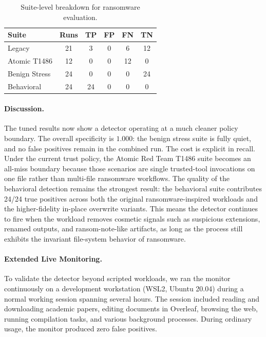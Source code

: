 \documentclass[twocolumn, 10pt]{scrartcl}
\begin{document}
\begin{table}[!ht]
    \centering
    \small
    \begin{tabular}{lccccc}
    \toprule
    \textbf{Suite} & \textbf{Runs} & \textbf{TP} & \textbf{FP} & \textbf{FN} & \textbf{TN} \\
    \midrule
    Legacy & 21 & 3 & 0 & 6 & 12 \\
    Atomic T1486 & 12 & 0 & 0 & 12 & 0 \\
    Benign Stress & 24 & 0 & 0 & 0 & 24 \\
    Behavioral & 24 & 24 & 0 & 0 & 0 \\
    \bottomrule
    \end{tabular}
    \caption{Suite-level breakdown for ransomware evaluation.}
    \label{tab:evalransom_updated_2}
\end{table}

\paragraph{Discussion.}
The tuned results now show a detector operating at a much cleaner policy boundary. The overall specificity is $1.000$: the benign stress suite is fully quiet, and no false positives remain in the combined run. The cost is explicit in recall. Under the current trust policy, the Atomic Red Team T1486 suite becomes an all-miss boundary because those scenarios are single trusted-tool invocations on one file rather than multi-file ransomware workflows. The quality of the behavioral detection remains the strongest result: the behavioral suite contributes 24/24 true positives across both the original ransomware-inspired workloads and the higher-fidelity in-place overwrite variants. This means the detector continues to fire when the workload removes cosmetic signals such as suspicious extensions, renamed outputs, and ransom-note-like artifacts, as long as the process still exhibits the invariant file-system behavior of ransomware.

\paragraph{Extended Live Monitoring.}
To validate the detector beyond scripted workloads, we ran the monitor continuously on a development workstation (WSL2, Ubuntu 20.04) during a normal working session spanning several hours. The session included reading and downloading academic papers, editing documents in Overleaf, browsing the web, running compilation tasks, and various background processes. During ordinary usage, the monitor produced zero false positives.
\end{document}
